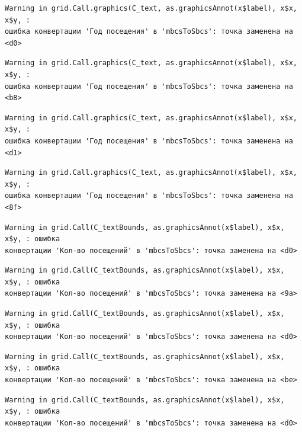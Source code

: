 \documentclass[
  letterpaper,
  DIV=11,
  numbers=noendperiod]{scrreprt}
\begin{document}
\begin{verbatim}
Warning in grid.Call.graphics(C_text, as.graphicsAnnot(x$label), x$x, x$y, :
ошибка конвертации 'Год посещения' в 'mbcsToSbcs': точка заменена на <d0>
\end{verbatim}

\begin{verbatim}
Warning in grid.Call.graphics(C_text, as.graphicsAnnot(x$label), x$x, x$y, :
ошибка конвертации 'Год посещения' в 'mbcsToSbcs': точка заменена на <b8>
\end{verbatim}

\begin{verbatim}
Warning in grid.Call.graphics(C_text, as.graphicsAnnot(x$label), x$x, x$y, :
ошибка конвертации 'Год посещения' в 'mbcsToSbcs': точка заменена на <d1>
\end{verbatim}

\begin{verbatim}
Warning in grid.Call.graphics(C_text, as.graphicsAnnot(x$label), x$x, x$y, :
ошибка конвертации 'Год посещения' в 'mbcsToSbcs': точка заменена на <8f>
\end{verbatim}

\begin{verbatim}
Warning in grid.Call(C_textBounds, as.graphicsAnnot(x$label), x$x, x$y, : ошибка
конвертации 'Кол-во посещений' в 'mbcsToSbcs': точка заменена на <d0>
\end{verbatim}

\begin{verbatim}
Warning in grid.Call(C_textBounds, as.graphicsAnnot(x$label), x$x, x$y, : ошибка
конвертации 'Кол-во посещений' в 'mbcsToSbcs': точка заменена на <9a>
\end{verbatim}

\begin{verbatim}
Warning in grid.Call(C_textBounds, as.graphicsAnnot(x$label), x$x, x$y, : ошибка
конвертации 'Кол-во посещений' в 'mbcsToSbcs': точка заменена на <d0>
\end{verbatim}

\begin{verbatim}
Warning in grid.Call(C_textBounds, as.graphicsAnnot(x$label), x$x, x$y, : ошибка
конвертации 'Кол-во посещений' в 'mbcsToSbcs': точка заменена на <be>
\end{verbatim}

\begin{verbatim}
Warning in grid.Call(C_textBounds, as.graphicsAnnot(x$label), x$x, x$y, : ошибка
конвертации 'Кол-во посещений' в 'mbcsToSbcs': точка заменена на <d0>
\end{verbatim}
\end{document}
